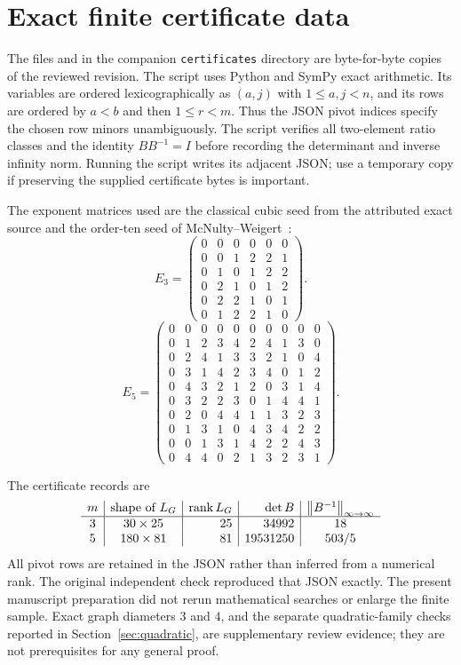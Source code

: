 \section{Exact finite certificate data}\label{app:certificates}
The files  and 
in the companion \texttt{certificates} directory are byte-for-byte copies of the reviewed revision. The script uses Python and SymPy exact arithmetic. Its variables
are ordered lexicographically as $(a,j)$ with $1\le a,j<n$, and its rows are
ordered by $a<b$ and then $1\le r<m$. Thus the JSON pivot indices specify the
chosen row minors unambiguously. The script verifies all two-element ratio
classes and the identity $BB^{-1}=I$ before recording the determinant and inverse
infinity norm. Running the script writes its adjacent JSON; use a temporary copy
if preserving the supplied certificate bytes is important.

The exponent matrices used are the classical cubic seed from the attributed
exact source and the order-ten seed of McNulty--Weigert~\cite[Appendix A]{MW}:
\[
 E_3=\begin{pmatrix}
0&0&0&0&0&0\\
0&0&1&2&2&1\\
0&1&0&1&2&2\\
0&2&1&0&1&2\\
0&2&2&1&0&1\\
0&1&2&2&1&0
\end{pmatrix}.
\]
\[
 E_5=\begin{pmatrix}
0&0&0&0&0&0&0&0&0&0\\
0&1&2&3&4&2&4&1&3&0\\
0&2&4&1&3&3&2&1&0&4\\
0&3&1&4&2&3&4&0&1&2\\
0&4&3&2&1&2&0&3&1&4\\
0&3&2&2&3&0&1&4&4&1\\
0&2&0&4&4&1&1&3&2&3\\
0&1&3&1&0&4&3&4&2&2\\
0&0&1&3&1&4&2&2&4&3\\
0&4&4&0&2&1&3&2&3&1
\end{pmatrix}.
\]

The certificate records are
\[
\begin{array}{c|c|r|r|c}
 m&\text{shape of }L_G&\operatorname{rank} L_G&\det B&\left\lVert B^{-1}\right\rVert_{\infty\to\infty}\\\hline
3&30\times25&25&34992&18\\
5&180\times81&81&19531250&503/5
\end{array}
\]
All pivot rows are retained in the JSON rather than inferred from a numerical
rank. The original independent check reproduced that JSON exactly. The present
manuscript preparation did not rerun mathematical searches or enlarge the finite
sample. Exact graph diameters $3$ and $4$, and the separate quadratic-family
checks reported in Section~\ref{sec:quadratic}, are supplementary review evidence;
they are not prerequisites for any general proof.
